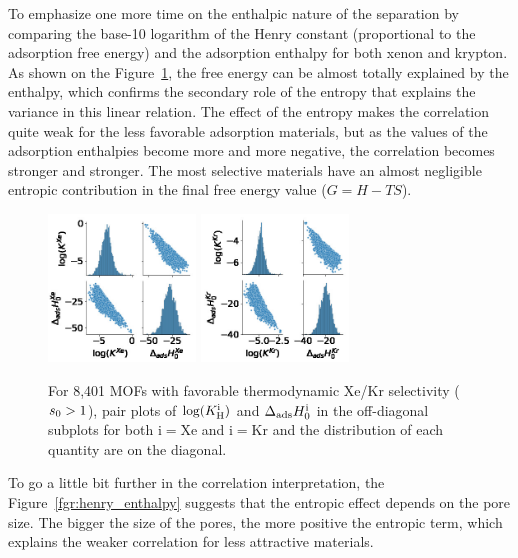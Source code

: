 \documentclass[main.tex]{subfiles}
\begin{document}
To emphasize one more time on the enthalpic nature of the separation by comparing the base-10 logarithm of the Henry constant (proportional to the adsorption free energy) and the adsorption enthalpy for both xenon and krypton. As shown on the Figure~\ref{fgr:SI:HK}, the free energy can be almost totally explained by the enthalpy, which confirms the secondary role of the entropy that explains the variance in this linear relation. The effect of the entropy makes the correlation quite weak for the less favorable adsorption materials, but as the values of the adsorption enthalpies become more and more negative, the correlation becomes stronger and stronger. The most selective materials have an almost negligible entropic contribution in the final free energy value ($G=H-TS$).

\begin{figure}[ht]
  \centering
    \includegraphics[width=0.35\textwidth]{figures/2-thermo/H_K_Xe.jpg}
    \includegraphics[width=0.35\textwidth]{figures/2-thermo/H_K_Kr.jpg}
    \caption{For 8,401 MOFs with favorable thermodynamic Xe/Kr selectivity ($s_{\text{0}} > 1$), pair plots of $\log(K_{\text{H}}^{\text{i}})$ and $\Delta_{\text{ads}}H^{\text{i}}_{\text{0}}$ in the off-diagonal subplots for both i$=$Xe and i$=$Kr and the distribution of each quantity are on the diagonal.}\label{fgr:SI:HK}
\end{figure}

To go a little bit further in the correlation interpretation, the Figure~\ref{fgr:henry_enthalpy} suggests that the entropic effect depends on the pore size. The bigger the size of the pores, the more positive the entropic term, which explains the weaker correlation for less attractive materials. 
\end{document}
